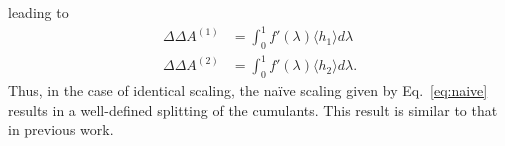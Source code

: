 \documentclass{article}
\begin{document}
leading to
\begin{equation}
\begin{split}
\Delta\Delta A^{(1)} &= 
	\int_0^1 f'(\lambda)
    \langle h_1 \rangle 
    d\lambda \\
\Delta\Delta A^{(2)} &= 
	\int_0^1 f'(\lambda)
    \langle h_2 \rangle
    d\lambda.
\end{split}
\end{equation}
Thus, in the case of identical scaling, the na\"ive scaling given by Eq.~\ref{eq:naive} results in a well-defined splitting of the cumulants. This result is similar to that in previous work.
\end{document}
